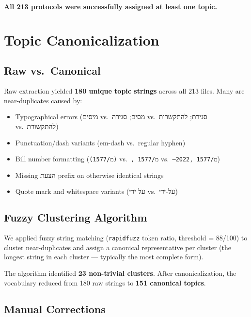 \documentclass[11pt,a4paper]{article}
\begin{document}
\textbf{All 213 protocols were successfully assigned at least one topic.}

\section{Topic Canonicalization}

\subsection*{Raw vs.\ Canonical}

Raw extraction yielded \textbf{180 unique topic strings} across all 213 files.
Many are near-duplicates caused by:

\begin{itemize}[noitemsep]
  \item Typographical errors
    (\texthebrew{מיסים} vs.\ \texthebrew{מסים};
     \texthebrew{סגירה} vs.\ \texthebrew{סגירת};
     \texthebrew{להתקשרות} vs.\ \texthebrew{להתקשורת})
  \item Punctuation/dash variants (em-dash vs.\ regular hyphen)
  \item Bill number formatting
    (\texttt{(מ/1577)} vs.\ \texttt{, מ/1577} vs.\ \texttt{---2022, מ/1577})
  \item Missing \texthebrew{הצעת} prefix on otherwise identical strings
  \item Quote mark and whitespace variants
    (\texthebrew{על ידי} vs.\ \texthebrew{על-ידי})
\end{itemize}

\subsection*{Fuzzy Clustering Algorithm}

We applied fuzzy string matching (\texttt{rapidfuzz} token ratio, threshold = 88/100)
to cluster near-duplicates and assign a canonical representative per cluster
(the longest string in each cluster --- typically the most complete form).

The algorithm identified \textbf{23 non-trivial clusters}. After canonicalization,
the vocabulary reduced from 180 raw strings to \textbf{151 canonical topics}.

\subsection*{Manual Corrections}
\end{document}
